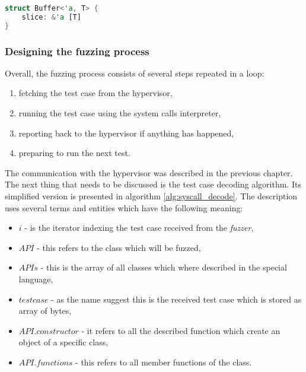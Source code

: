 \begin{minipage}{\linewidth}
\begin{lstlisting}[language=rust,caption={Generic and lifetime parameter exmaple},label={lst:generics}]
struct Buffer<'a, T> {
    slice: &'a [T]
}
\end{lstlisting}
\end{minipage}

\subsubsection{Designing the fuzzing process} \label{sec:testcase}
Overall, the fuzzing process consists of several steps repeated in a loop:
\begin{enumerate}
    \item fetching the test case from the hypervisor,
    \item running the test case using the system calls interpreter,
    \item reporting back to the hypervisor if anything has happened,
    \item preparing to run the next test.
\end{enumerate}
The communication with the hypervisor was described in the previous chapter. The next thing that needs to be discussed is the test case decoding algorithm. Its simplified version is presented in algorithm \ref{alg:syscall_decode}. The description uses several terms and entities which have the following meaning:
\begin{itemize}
    \item $i$ - is the iterator indexing the test case received from the \textit{fuzzer},
    \item $API$ - this refers to the class which will be fuzzed,
    \item $APIs$ - this is the array of all classes which where described in the special language,
    \item $testcase$ - as the name suggest this is the received test case which is stored as array of bytes,
    \item $API.constructor$ - it refers to all the described function which create an object of a specific class,
    \item $API.functions$ - this refers to all member functions of the class.
\end{itemize}
